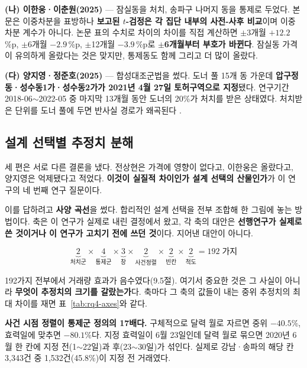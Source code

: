 \textbf{(나) 이한웅·이춘원(2025)} --- 잠실동을 처치, 송파구 나머지 동을 통제로
두었다. 본문은 이중차분을 표방하나 \textbf{보고된 $t$-검정은 각 집단 내부의
사전-사후 비교}이며 이중차분 계수가 아니다. 논문 표의 수치로 차이의 차이를 직접
계산하면 $\pm$3개월 $+12.2$\,\%p, $\pm$6개월 $-2.9$\,\%p, $\pm$12개월
$-3.9$\,\%p로 \textbf{$\pm$6개월부터 부호가 바뀐다}. 잠실동 가격이 유의하게
올랐다는 것은 맞지만, 통제동도 함께 그리고 더 많이 올랐다.

\textbf{(다) 양지영·정준호(2025)} --- 합성대조군법을 썼다. 도너 풀 15개 동 가운데
\textbf{압구정동·성수동1가·성수동2가가 2021년 4월 27일 토허구역으로 지정}됐다.
연구기간 2018-06$\sim$2022-05 중 마지막 13개월 동안 도너의 20\%가 처치를 받은
상태였다. 처치받은 단위를 도너 풀에 두면 반사실 경로가 왜곡된다
\citep{abadie2010synthetic}.

\subsection{설계 선택별 추정치 분해}

세 편은 서로 다른 결론을 냈다. 전상현은 가격에 영향이 없다고, 이한웅은 올랐다고,
양지영은 억제됐다고 적었다. \textbf{이것이 실질적 차이인가 설계 선택의
산물인가}가 이 연구의 네 번째 연구 질문이다.

이를 답하려고 \textbf{사양 곡선}\citep{simonsohn2020specification}을 썼다.
합리적인 설계 선택을 전부 조합해 한 그림에 놓는 방법이다. 축은 이 연구가 실제로
내린 결정에서 왔고, 각 축의 대안은 \textbf{선행연구가 실제로 쓴 것이거나 이
연구가 고치기 전에 쓰던 것}이다. 지어낸 대안이 아니다.

\[
\underbrace{2}_{\text{처치군}} \times \underbrace{4}_{\text{통제군}}
\times \underbrace{3}_{\text{창}} \times \underbrace{2}_{\text{사건정렬}}
\times \underbrace{2}_{\text{빈칸}} \times \underbrace{2}_{\text{척도}}
= 192 \;\text{가지}
\]

192가지 전부에서 거래량 효과가 음수였다(9.5절). 여기서 중요한 것은 그 사실이
아니라 \textbf{무엇이 추정치의 크기를 갈랐는가}다. 축마다 그 축의 값들이 내는
중위 추정치의 최대 차이를 재면 표~\ref{tab:rq4-axes}와 같다.



\textbf{사건 시점 정렬이 통제군 정의의 17배다.} 구체적으로 달력 월로 자르면
중위 $-40.5\%$, 효력일에 맞추면 $-80.1\%$다. 지정 효력일이 6월 23일인데 달력
월로 묶으면 2020년 6월 한 칸에 지정 전(1$\sim$22일)과 후(23$\sim$30일)가 섞인다.
실제로 강남·송파의 해당 칸 3,343건 중 1,532건(45.8\%)이 지정 전 거래였다.

